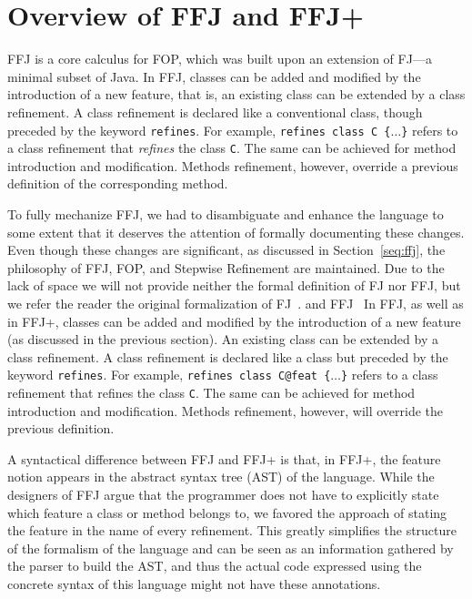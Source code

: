 \chapter{Overview of \ac{FFJ} and \ac{FFJ+}}\label{seq:offj}

\acf{FFJ} is a core calculus for \acf{FOP}, which was built 
upon an extension of \acf{FJ}---a minimal subset of Java. 
In \ac{FFJ}, classes can be added and modified by the 
introduction of a new feature, that is, 
an existing class can be extended by a class refinement. 
A class refinement is declared like a conventional class, though 
preceded by the keyword \texttt{refines}. For example, 
\texttt{refines class C \{$\dots$\}} refers to a class
refinement that
\emph{refines} the class \texttt{C}. The same can be achieved 
for method introduction and modification. Methods refinement,
however, override a previous definition of the corresponding 
method.
 
To fully mechanize \ac{FFJ}, we had to disambiguate and enhance 
the language to some extent that it  deserves the attention of 
formally documenting these changes. 
Even though these changes are significant, as discussed in Section~\ref{seq:ffj}, 
the philosophy of \ac{FFJ}, \ac{FOP}, and Stepwise Refinement are maintained.
Due to the lack of space we will not provide neither the formal definition 
of \ac{FJ} nor \ac{FFJ}, but we refer the reader the original formalization of \ac{FJ}~\cite{igarashi_featherweight_2001}.
 and \ac{FFJ}~\cite{apel_feature_2008}
In \ac{FFJ}, as well as in \ac{FFJ+}, classes can be added and 
modified by the introduction of a new feature (as discussed in the previous section).
An existing class can be extended by a class refinement. A class refinement is declared like a class but
preceded by the keyword \texttt{refines}. For example, \texttt{refines class C@feat \{$\dots$\}} refers to a class refinement that
refines the class \texttt{C}. The same can be achieved for method introduction and modification. Methods refinement,
however, will override the previous definition.

A syntactical difference between \ac{FFJ} and \ac{FFJ+} is that, in \ac{FFJ+}, 
the feature notion appears in the abstract syntax tree (AST) of the language.
While the designers of \ac{FFJ} argue that the programmer does not have 
to explicitly state which feature a class or method belongs to, 
we favored the approach of stating the feature in the name of every refinement.
This greatly simplifies the structure of the formalism of the language and can be 
seen as an information gathered by the parser to build the AST, and thus 
the actual code expressed using the concrete syntax of this language 
might not have these annotations.

